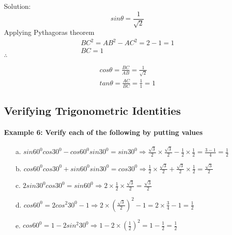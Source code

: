 \documentclass{article}
\begin{document}
\begin{center}
\end{center}

{\small Solution:}
\[ sin\theta = \frac{1}{\sqrt{2}} \]
Applying Pythagoras theorem
\[
  \begin{aligned}
    BC^{2} = AB^{2} - AC^{2} = 2 - 1 = 1 \\
    BC = 1
  \end{aligned}
\]
$\therefore$

\[
  \begin{aligned}
    cos\theta = \frac{BC}{AB} = \frac{1}{\sqrt{2}} \\
    tan\theta = \frac{AC}{BC} = \frac{1}{1} = 1
  \end{aligned}
\]

\subsection{Verifying Trigonometric Identities}
\paragraph{Example 6: Verify each of the following by putting values}

\begin{enumerate}
  \item[a.] $sin 60^{0} cos 30^{0} - cos 60^{0} sin 30^{0} = sin 30^{0} \Rightarrow \frac{\sqrt{3}}{2} \times \frac{\sqrt{3}}{2} - \frac{1}{2} \times \frac{1}{2} = \frac{3-1}{4}=\frac{1}{2}$
  \item[b.] $cos 60^{0} cos 30^{0} + sin 60^{0} sin 30^{0} = cos 30^{0} \Rightarrow \frac{1}{2} \times \frac{\sqrt{3}}{2} + \frac{\sqrt{3}}{2} \times \frac{1}{2} = \frac{\sqrt{3}}{2}$
  \item[c.] $2 sin 30^{0} cos 30^{0} = sin 60^{0} \Rightarrow 2 \times \frac{1}{2} \times \frac{\sqrt{3}}{2} = \frac{\sqrt{3}}{2}$
  \item[d.] $cos 60^{0} = 2 cos^{2} 30^{0} - 1 \Rightarrow 2 \times \left(\frac{\sqrt{3}}{2}\right)^{2} - 1 = 2 \times \frac{3}{4} - 1 = \frac{1}{2}$
  \item[e.] $cos 60^{0} = 1 - 2 sin^{2} 30^{0} \Rightarrow 1 - 2 \times \left(\frac{1}{2}\right)^{2} = 1 - \frac{1}{2} = \frac{1}{2}$
\end{enumerate}
\end{document}
